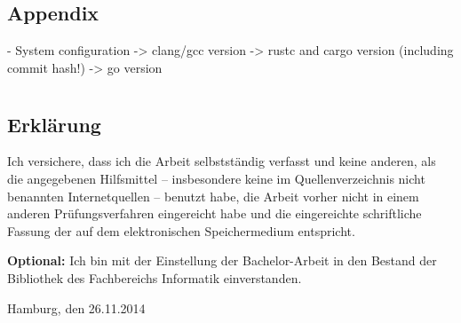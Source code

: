 \documentclass[
	12pt,
	a4paper,
	BCOR10mm,
	DIV14,
	listof=totoc,
	bibliography=totoc,
	headsepline
]{scrreprt}
\begin{document}




\printbibliography


\listoffigures
\listoftables
\lstlistoflistings


\begin{appendices}

\chapter{Appendix}

- System configuration
	-> clang/gcc version
	-> rustc and cargo version (including commit hash!)
	-> go version

\end{appendices}

\newpage

\thispagestyle{empty}

\chapter*{}

\section*{Erklärung}

Ich versichere, dass ich die Arbeit selbstständig verfasst und keine anderen, als die angegebenen Hilfsmittel -- insbesondere keine im Quellenverzeichnis nicht benannten Internetquellen -- benutzt habe, die Arbeit vorher nicht in einem anderen Prüfungsverfahren eingereicht habe und die eingereichte schriftliche Fassung der auf dem elektronischen Speichermedium entspricht.

\smallskip

\textbf{Optional:} Ich bin mit der Einstellung der Bachelor-Arbeit in den Bestand der Bibliothek des Fachbereichs Informatik einverstanden.

\bigskip
\bigskip
\bigskip

Hamburg, den 26.11.2014  \quad \dotfill
\end{document}
